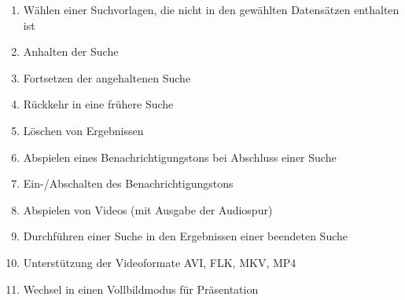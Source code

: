 \begin{enumerate} [label=\bfseries /F \arabic*0/]
	\subsection{Wunsch}
	\item Wählen einer Suchvorlagen, die nicht in den gewählten Datensätzen enthalten ist
	\newline
	\item Anhalten der Suche 	%
	\item Fortsetzen der angehaltenen Suche 	%
	\item Rückkehr in eine frühere Suche %
	\newline
	\item Löschen von Ergebnissen %
	\item Abspielen eines Benachrichtigungstons bei Abschluss einer Suche
	\item Ein-/Abschalten des Benachrichtigungstons
	\item Abspielen von Videos (mit Ausgabe der Audiospur)
	\item Durchführen einer Suche in den Ergebnissen einer beendeten Suche
	\newline
	\item Unterstützung der Videoformate AVI, FLK, MKV, MP4
	\item Wechsel in einen Vollbildmodus für Präsentation
\end{enumerate}
